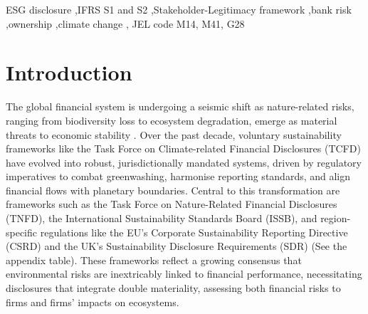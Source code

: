 \documentclass[
  authoryear]{elsarticle}
\begin{document}
\begin{frontmatter}
\begin{keyword}
    ESG disclosure \sep IFRS S1 and S2 \sep Stakeholder-Legitimacy
framework \sep bank risk \sep ownership \sep climate change \sep 
    JEL code M14, M41, G28
\end{keyword}
\end{frontmatter}
    

\newpage

\section{Introduction}\label{introduction}

The global financial system is undergoing a seismic shift as
nature-related risks, ranging from biodiversity loss to ecosystem
degradation, emerge as material threats to economic stability
\citep{UNEP2023}. Over the past decade, voluntary sustainability
frameworks like the Task Force on Climate-related Financial Disclosures
(TCFD) have evolved into robust, jurisdictionally mandated systems,
driven by regulatory imperatives to combat greenwashing, harmonise
reporting standards, and align financial flows with planetary
boundaries. Central to this transformation are frameworks such as the
Task Force on Nature-Related Financial Disclosures (TNFD), the
International Sustainability Standards Board (ISSB), and region-specific
regulations like the EU's Corporate Sustainability Reporting Directive
(CSRD) and the UK's Sustainability Disclosure Requirements (SDR) (See
the appendix table). These frameworks reflect a growing consensus that
environmental risks are inextricably linked to financial performance,
necessitating disclosures that integrate double materiality, assessing
both financial risks to firms and firms' impacts on ecosystems.
\end{document}
